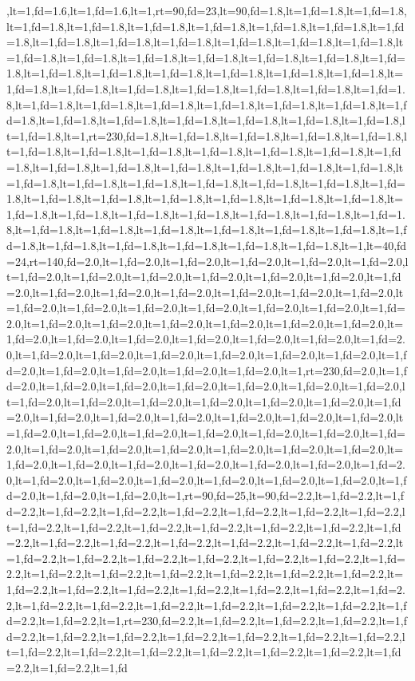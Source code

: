 \documentclass[a4paper,10pt]{article}
\begin{document}
,lt=1,fd=1.6,lt=1,fd=1.6,lt=1,rt=90,fd=23,lt=90,fd=1.8,lt=1,fd=1.8,lt=1,fd=1.8,lt=1,fd=1.8,lt=1,fd=1.8,lt=1,fd=1.8,lt=1,fd=1.8,lt=1,fd=1.8,lt=1,fd=1.8,lt=1,fd=1.8,lt=1,fd=1.8,lt=1,fd=1.8,lt=1,fd=1.8,lt=1,fd=1.8,lt=1,fd=1.8,lt=1,fd=1.8,lt=1,fd=1.8,lt=1,fd=1.8,lt=1,fd=1.8,lt=1,fd=1.8,lt=1,fd=1.8,lt=1,fd=1.8,lt=1,fd=1.8,lt=1,fd=1.8,lt=1,fd=1.8,lt=1,fd=1.8,lt=1,fd=1.8,lt=1,fd=1.8,lt=1,fd=1.8,lt=1,fd=1.8,lt=1,fd=1.8,lt=1,fd=1.8,lt=1,fd=1.8,lt=1,fd=1.8,lt=1,fd=1.8,lt=1,fd=1.8,lt=1,fd=1.8,lt=1,fd=1.8,lt=1,fd=1.8,lt=1,fd=1.8,lt=1,fd=1.8,lt=1,fd=1.8,lt=1,fd=1.8,lt=1,fd=1.8,lt=1,fd=1.8,lt=1,fd=1.8,lt=1,fd=1.8,lt=1,fd=1.8,lt=1,fd=1.8,lt=1,fd=1.8,lt=1,rt=230,fd=1.8,lt=1,fd=1.8,lt=1,fd=1.8,lt=1,fd=1.8,lt=1,fd=1.8,lt=1,fd=1.8,lt=1,fd=1.8,lt=1,fd=1.8,lt=1,fd=1.8,lt=1,fd=1.8,lt=1,fd=1.8,lt=1,fd=1.8,lt=1,fd=1.8,lt=1,fd=1.8,lt=1,fd=1.8,lt=1,fd=1.8,lt=1,fd=1.8,lt=1,fd=1.8,lt=1,fd=1.8,lt=1,fd=1.8,lt=1,fd=1.8,lt=1,fd=1.8,lt=1,fd=1.8,lt=1,fd=1.8,lt=1,fd=1.8,lt=1,fd=1.8,lt=1,fd=1.8,lt=1,fd=1.8,lt=1,fd=1.8,lt=1,fd=1.8,lt=1,fd=1.8,lt=1,fd=1.8,lt=1,fd=1.8,lt=1,fd=1.8,lt=1,fd=1.8,lt=1,fd=1.8,lt=1,fd=1.8,lt=1,fd=1.8,lt=1,fd=1.8,lt=1,fd=1.8,lt=1,fd=1.8,lt=1,fd=1.8,lt=1,fd=1.8,lt=1,fd=1.8,lt=1,fd=1.8,lt=1,fd=1.8,lt=1,fd=1.8,lt=1,fd=1.8,lt=1,fd=1.8,lt=1,fd=1.8,lt=1,lt=40,fd=24,rt=140,fd=2.0,lt=1,fd=2.0,lt=1,fd=2.0,lt=1,fd=2.0,lt=1,fd=2.0,lt=1,fd=2.0,lt=1,fd=2.0,lt=1,fd=2.0,lt=1,fd=2.0,lt=1,fd=2.0,lt=1,fd=2.0,lt=1,fd=2.0,lt=1,fd=2.0,lt=1,fd=2.0,lt=1,fd=2.0,lt=1,fd=2.0,lt=1,fd=2.0,lt=1,fd=2.0,lt=1,fd=2.0,lt=1,fd=2.0,lt=1,fd=2.0,lt=1,fd=2.0,lt=1,fd=2.0,lt=1,fd=2.0,lt=1,fd=2.0,lt=1,fd=2.0,lt=1,fd=2.0,lt=1,fd=2.0,lt=1,fd=2.0,lt=1,fd=2.0,lt=1,fd=2.0,lt=1,fd=2.0,lt=1,fd=2.0,lt=1,fd=2.0,lt=1,fd=2.0,lt=1,fd=2.0,lt=1,fd=2.0,lt=1,fd=2.0,lt=1,fd=2.0,lt=1,fd=2.0,lt=1,fd=2.0,lt=1,fd=2.0,lt=1,fd=2.0,lt=1,fd=2.0,lt=1,fd=2.0,lt=1,fd=2.0,lt=1,fd=2.0,lt=1,fd=2.0,lt=1,fd=2.0,lt=1,fd=2.0,lt=1,rt=230,fd=2.0,lt=1,fd=2.0,lt=1,fd=2.0,lt=1,fd=2.0,lt=1,fd=2.0,lt=1,fd=2.0,lt=1,fd=2.0,lt=1,fd=2.0,lt=1,fd=2.0,lt=1,fd=2.0,lt=1,fd=2.0,lt=1,fd=2.0,lt=1,fd=2.0,lt=1,fd=2.0,lt=1,fd=2.0,lt=1,fd=2.0,lt=1,fd=2.0,lt=1,fd=2.0,lt=1,fd=2.0,lt=1,fd=2.0,lt=1,fd=2.0,lt=1,fd=2.0,lt=1,fd=2.0,lt=1,fd=2.0,lt=1,fd=2.0,lt=1,fd=2.0,lt=1,fd=2.0,lt=1,fd=2.0,lt=1,fd=2.0,lt=1,fd=2.0,lt=1,fd=2.0,lt=1,fd=2.0,lt=1,fd=2.0,lt=1,fd=2.0,lt=1,fd=2.0,lt=1,fd=2.0,lt=1,fd=2.0,lt=1,fd=2.0,lt=1,fd=2.0,lt=1,fd=2.0,lt=1,fd=2.0,lt=1,fd=2.0,lt=1,fd=2.0,lt=1,fd=2.0,lt=1,fd=2.0,lt=1,fd=2.0,lt=1,fd=2.0,lt=1,fd=2.0,lt=1,fd=2.0,lt=1,fd=2.0,lt=1,rt=90,fd=25,lt=90,fd=2.2,lt=1,fd=2.2,lt=1,fd=2.2,lt=1,fd=2.2,lt=1,fd=2.2,lt=1,fd=2.2,lt=1,fd=2.2,lt=1,fd=2.2,lt=1,fd=2.2,lt=1,fd=2.2,lt=1,fd=2.2,lt=1,fd=2.2,lt=1,fd=2.2,lt=1,fd=2.2,lt=1,fd=2.2,lt=1,fd=2.2,lt=1,fd=2.2,lt=1,fd=2.2,lt=1,fd=2.2,lt=1,fd=2.2,lt=1,fd=2.2,lt=1,fd=2.2,lt=1,fd=2.2,lt=1,fd=2.2,lt=1,fd=2.2,lt=1,fd=2.2,lt=1,fd=2.2,lt=1,fd=2.2,lt=1,fd=2.2,lt=1,fd=2.2,lt=1,fd=2.2,lt=1,fd=2.2,lt=1,fd=2.2,lt=1,fd=2.2,lt=1,fd=2.2,lt=1,fd=2.2,lt=1,fd=2.2,lt=1,fd=2.2,lt=1,fd=2.2,lt=1,fd=2.2,lt=1,fd=2.2,lt=1,fd=2.2,lt=1,fd=2.2,lt=1,fd=2.2,lt=1,fd=2.2,lt=1,fd=2.2,lt=1,fd=2.2,lt=1,fd=2.2,lt=1,fd=2.2,lt=1,fd=2.2,lt=1,rt=230,fd=2.2,lt=1,fd=2.2,lt=1,fd=2.2,lt=1,fd=2.2,lt=1,fd=2.2,lt=1,fd=2.2,lt=1,fd=2.2,lt=1,fd=2.2,lt=1,fd=2.2,lt=1,fd=2.2,lt=1,fd=2.2,lt=1,fd=2.2,lt=1,fd=2.2,lt=1,fd=2.2,lt=1,fd=2.2,lt=1,fd=2.2,lt=1,fd=2.2,lt=1,fd=2.2,lt=1,fd=2.2,lt=1,fd
\end{document}
